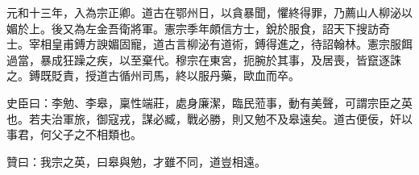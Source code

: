 \begin{pinyinscope}
 元和十三年，入為宗正卿。道古在鄂州日，以貪暴聞，懼終得罪，乃薦山人柳泌以媚於上。後又為左金吾衛將軍。憲宗季年頗信方士，銳於服食，詔天下搜訪奇
 士。宰相皇甫鎛方諛媚固寵，道古言柳泌有道術，鎛得進之，待詔翰林。憲宗服餌過當，暴成狂躁之疾，以至棄代。穆宗在東宮，扼腕於其事，及居喪，皆竄逐誅之。鎛既貶責，授道古循州司馬，終以服丹藥，歐血而卒。



 史臣曰：李勉、李皋，稟性端莊，處身廉潔，臨民蒞事，動有美聲，可謂宗臣之英也。若夫治軍旅，御寇戎，謀必臧，戰必勝，則又勉不及皋遠矣。道古便佞，奸以事君，何父子之不相類也。



 贊曰：我宗之英，曰皋與勉，才雖不同，道豈相遠。



\end{pinyinscope}